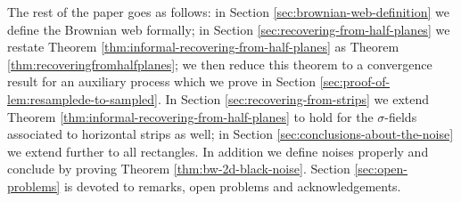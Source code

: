 {The rest of the paper goes as follows: in Section \ref{sec:brownian-web-definition} we define the
Brownian web formally; in Section \ref{sec:recovering-from-half-planes} we restate
Theorem \ref{thm:informal-recovering-from-half-planes} as
Theorem \ref{thm:recoveringfromhalfplanes}; we then reduce this theorem to a
convergence result for an auxiliary process which we prove in Section
\ref{sec:proof-of-lem:resamplede-to-sampled}.  In Section \ref{sec:recovering-from-strips} we extend Theorem \ref{thm:informal-recovering-from-half-planes} to hold for the
$\sigma$-fields associated to horizontal strips as well; in Section \ref{sec:conclusions-about-the-noise}
we extend further to all rectangles.  In addition we define noises
properly and conclude by proving Theorem \ref{thm:bw-2d-black-noise}.  Section \ref{sec:open-problems} is devoted to
remarks, open problems and acknowledgements.
}
